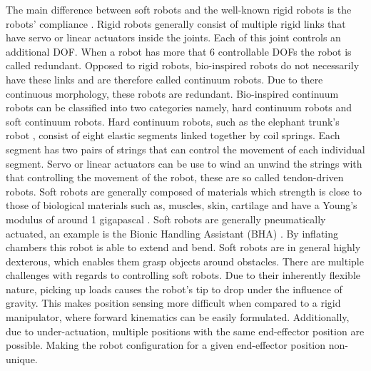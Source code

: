 The main difference between soft robots and the well-known rigid robots is the robots' compliance \cite{trivedi2008soft}. Rigid robots generally consist of multiple rigid links that have servo or linear actuators inside the joints. Each of this joint controls an additional DOF. When a robot has more that 6 controllable DOFs the robot is called redundant. Opposed to rigid robots, bio-inspired robots do not necessarily have these links and are therefore called continuum robots. Due to there continuous morphology, these robots are redundant. Bio-inspired continuum robots can be classified into two categories namely, hard continuum robots and soft continuum robots. Hard continuum robots, such as the elephant trunk's robot  \cite{cieslak1999elephant}, consist of eight elastic segments linked together by coil springs. Each segment has two pairs of strings that can control the movement of each individual segment. Servo or linear actuators can be use to wind an unwind the strings with that controlling the movement of the robot, these are so called tendon-driven robots. Soft robots are generally composed of materials which strength is close to those of biological materials such as, muscles, skin, cartilage and have a Young's modulus of around 1 gigapascal \cite{rus2015design}. Soft robots are generally pneumatically actuated, an example is the Bionic Handling Assistant (BHA) \cite{rolf2012constant}. By inflating chambers this robot is able to extend and bend. Soft robots are in general highly dexterous, which enables them grasp objects around obstacles. There are multiple challenges with regards to controlling soft robots. Due to their inherently flexible nature, picking up loads causes the robot's tip to drop under the influence of gravity. This makes position sensing more difficult when compared to a rigid manipulator, where forward kinematics can be easily formulated. Additionally, due to under-actuation, multiple positions with the same end-effector position are possible. Making the robot configuration for a given end-effector position non-unique.

